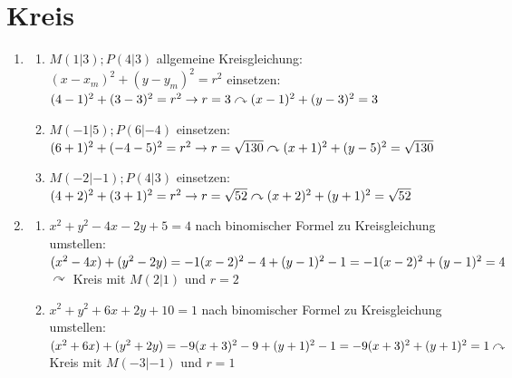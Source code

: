 \section{Kreis}
\begin{enumerate}
\item \begin{enumerate}
		\item $M(1|3); P(4|3)$ \newline
		allgemeine Kreisgleichung: $(x-x_m)^2 + (y-y_m)^2 =r^2$ \newline
		einsetzen: $(4-1)^2 + (3-3)^2 =r^2\\
		\rightarrow r=3\\
		\curvearrowright (x-1)^2+(y-3)^2 = 3$
		
		\item $M(-1|5); P(6|-4)$ \newline
		einsetzen: $(6+1)^2 + (-4-5)^2 =r^2\\
		\rightarrow r=\sqrt{130}\\
		\curvearrowright (x+1)^2+(y-5)^2 = \sqrt{130}$
		
		\item $M(-2|-1); P(4|3)$ \newline
		einsetzen: $(4+2)^2 + (3+1)^2 =r^2\\
		\rightarrow r=\sqrt{52}\\
		\curvearrowright (x+2)^2+(y+1)^2 = \sqrt{52}$
		
		\end{enumerate}
		
	\item \begin{enumerate}
			\item $x^2 + y^2 - 4x - 2y + 5 = 4$ \newline
			nach binomischer Formel zu Kreisgleichung umstellen:\newline
			$ (x^2-4x)+ (y^2-2y) = -1 \\
			(x-2)^2 -4 + (y-1)^2 -1 = -1 \\
			(x-2)^2 + (y-1)^2 = 4$\newline \newline
			$\curvearrowright$ Kreis mit $M(2|1)$ und $r= 2$
			
			\item $ x^2 + y^2 +6x +2y+10 =1$ \newline
			nach binomischer Formel zu Kreisgleichung umstellen:\newline
			$ (x^2+ 6x) + (y^2 + 2y) = -9 \\
			(x+3)^2 -9 +(y+1)^2 -1 = -9\\
			(x+3)^2 +(y+1)^2 = 1\\ \\
			\curvearrowright$ Kreis mit $M(-3|-1)$ und $r=1$ 
			\end{enumerate}
			

\end{enumerate}
